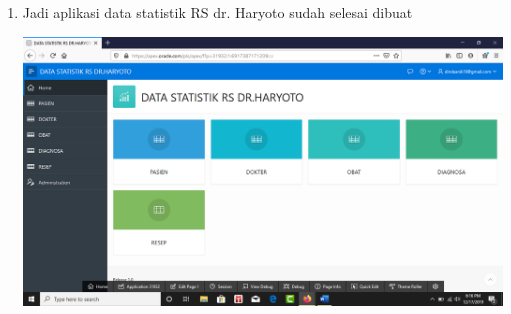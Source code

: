 \begin{enumerate}
\begin{center}
    \end{center}
    \item Jadi aplikasi data statistik RS dr. Haryoto sudah selesai dibuat
     \begin{center}
    \includegraphics[width=10cm\textwidth]{gambar/28.png}
    \end{center}
\end{enumerate}



        
    